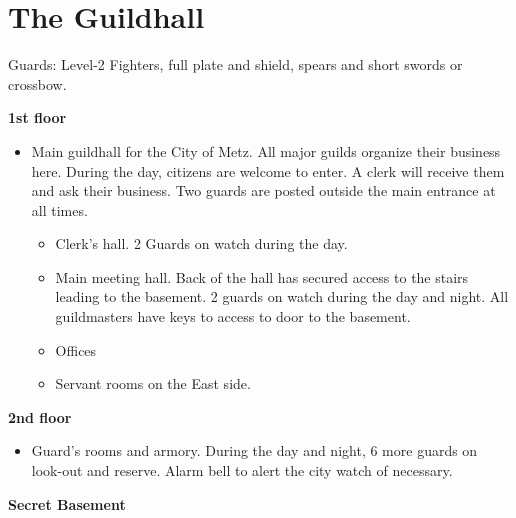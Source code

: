 \documentclass[
]{book}
\providecommand{\tightlist}{%
  \setlength{\itemsep}{0pt}\setlength{\parskip}{0pt}}
\begin{document}
\section{The Guildhall}\label{the-guildhall}

Guards: Level-2 Fighters, full plate and shield, spears and short swords or crossbow.

\textbf{1st floor}

\begin{itemize}
\item
  Main guildhall for the City of Metz. All major guilds organize their business here. During the day, citizens are welcome to enter. A clerk will receive them and ask their business. Two guards are posted outside the main entrance at all times.

  \begin{itemize}
  \item
    Clerk's hall. 2 Guards on watch during the day.
  \item
    Main meeting hall. Back of the hall has secured access to the stairs leading to the basement. 2 guards on watch during the day and night. All guildmasters have keys to access to door to the basement.
  \item
    Offices
  \item
    Servant rooms on the East side.
  \end{itemize}
\end{itemize}

\textbf{2nd floor}

\begin{itemize}
\tightlist
\item
  Guard's rooms and armory. During the day and night, 6 more guards on look-out and reserve. Alarm bell to alert the city watch of necessary.
\end{itemize}

\textbf{Secret Basement}
\end{document}
